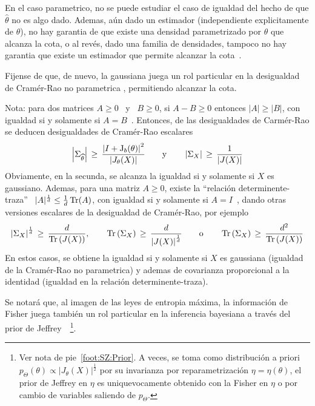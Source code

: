 %
\noindent En el  caso parametrico, no se puede estudiar el  caso de igualdad del
hecho  de  que  $\widehat{\theta}$ no  es  algo  dado.   Ademas, a\'un  dado  un
estimador  (independiente explicitamente de  $\theta$), no  hay garantia  de que
existe  una  densidad parametrizado  por  $\theta$ que  alcanza  la  cota, o  al
rev\'es, dado una  familia de densidades, tampoco no hay  garantia que existe un
estimador que permite alcanzar la cota~\cite{CovTho06,  Kay93}.

Fijense de que, de nuevo, la gaussiana juega un rol particular en la desigualdad
de Cram\'er-Rao no parametrica , permitiendo alcanzar la cota.

Nota: para dos  matrices $A \ge 0$  \ y \ $B \ge  0$, si $A - B  \ge 0$ entonces
$|A|  \ge  |B|$,   con  igualdad  si  y  solamente   si  $A  =  B$~\cite[cap.~1,
teorema~25]{MagNeu99}.   Entonces,  de  las  desigualdades  de  Carm\'er-Rao  se
deducen     desigualdades     de     Cram\'er-Rao    escalares
%
\[
\left|   \Sigma_{\widehat{\theta}}  \right|   \,   \ge  \,   \frac{\left|  I   +
    \operatorname{J}_b(\theta) \right|^2}{\left| J_\theta(X) \right|} \qquad \mbox{y} \qquad
\left| \Sigma_X \right| \, \ge \, \frac{1}{\left| J(X) \right|}
\]
%
Obviamente,  en la secunda,  se alcanza  la igualdad  si y  solamente si  $X$ es
gaussiano.  Ademas,  para   una  matriz  $A  \ge  0$,   existe  la  ``relaci\'on
determinente-traza''  \ $|A|^{\frac1d} \le  \frac1d \operatorname{Tr}(A)$,  con igualdad  si y
solamente  si $A  = I$~\cite[cap.~11,  sec.~4]{MagNeu99}, dando  otras versiones
escalares de la desigualdad de Cram\'er-Rao, por ejemplo
%
\[
\left| \Sigma_X  \right|^{\frac1d} \,  \ge \, \frac{d}{\operatorname{Tr}\left(  J(X) \right)},
\qquad   \operatorname{Tr}\left(   \Sigma_X   \right)   \,   \ge   \,   \frac{d}{\left|   J(X)
  \right|^{\frac1d}} \qquad \mbox{o} \qquad \operatorname{Tr}\left( \Sigma_X \right) \, \ge \,
\frac{d^2}{\operatorname{Tr}\left( J(X) \right)}
\]
%
En  estos casos,  se obtiene  la igualdad  si y  solamente si  $X$  es gaussiana
(igualdad de la Cram\'er-Rao no parametrica) y ademas de covarianza proporcional
a la identidad (igualdad en la relaci\'on determinente-traza).

Se notar\'a que,  al imagen de las leyes de  entropia m\'axima, la informaci\'on
de  Fisher  juega tambi\'en  un  rol particular  en  la  inferencia bayesiana  a
trav\'es del prior de Jeffrey~\cite{Jef46, Jef48, LehCas98, Rob07}~\footnote{Ver
  nota  de pie~\ref{foot:SZ:Prior}.   A  veces, se  toma  como distribuci\'on  a
  priori $p_\Theta(\theta) \propto  |J_\theta(X)|^\frac12$ por su invarianza por
  reparametrizaci\'on $\eta =  \eta(\theta)$, \ie el prior de  Jeffrey en $\eta$
  es uniquevocamente obtenido con la Fisher  en $\eta$ o por cambio de variables
  saliendo de $p_\Theta$.}.


